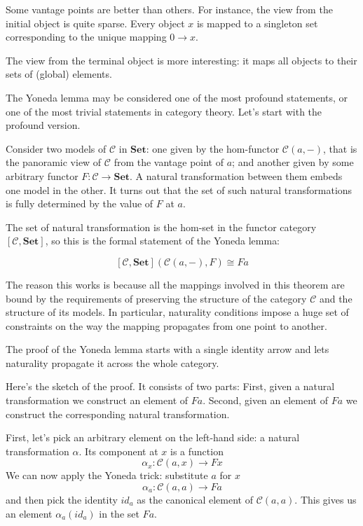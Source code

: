 \documentclass[DaoFP]{subfiles}
\begin{document}
Some vantage points are better than others. For instance, the view from the initial object is quite sparse. Every object $x$ is mapped to a singleton set corresponding to the unique mapping $0 \to x$. 

The view from the terminal object is more interesting: it maps all objects to their sets of (global) elements. 

The Yoneda lemma may be considered one of the most profound statements, or one of the most trivial statements in category theory. Let's start with the profound version. 

Consider two models of $\mathcal{C}$ in $\mathbf{Set}$: one given by the hom-functor  $\mathcal{C}(a, -)$, that is the panoramic view of $\mathcal{C}$ from the vantage point of $a$; and another given by some arbitrary functor $F \colon \mathcal{C} \to \mathbf{Set}$. A natural transformation between them embeds one model in the other. It turns out that the set of such natural transformations is fully determined by the value of $F$ at $a$.

The set of natural transformation is the hom-set in the functor category $[\mathcal{C}, \mathbf{Set}]$, so this is the formal statement of the Yoneda lemma:

\[ [\mathcal{C}, \mathbf{Set}]( \mathcal{C}(a, -), F) \cong F a \]

The reason this works is because all the mappings involved in this theorem are bound by the requirements of preserving the structure of the category $\mathcal{C}$ and the structure of its models. In particular, naturality conditions impose a huge set of constraints on the way the mapping propagates from one point to another. 

The proof of the Yoneda lemma starts with a single identity arrow and lets naturality propagate it across the whole category.

Here's the sketch of the proof. It consists of two parts: First, given a natural transformation we construct an element of $F a$. Second, given an element of $F a$ we construct the corresponding natural transformation. 

First, let's pick an arbitrary element on the left-hand side: a natural transformation $\alpha$. Its component at $x$ is a function
\[ \alpha_x \colon \mathcal{C}(a, x) \to F x \]
We can now apply the Yoneda trick: substitute $a$ for $x$ 
\[ \alpha_a \colon \mathcal{C}(a, a) \to F a \]
and then pick the identity $id_a$ as the canonical element of $\mathcal{C}(a, a)$. This gives us an element $\alpha_a (id_a)$ in the set $F a$.
\end{document}
